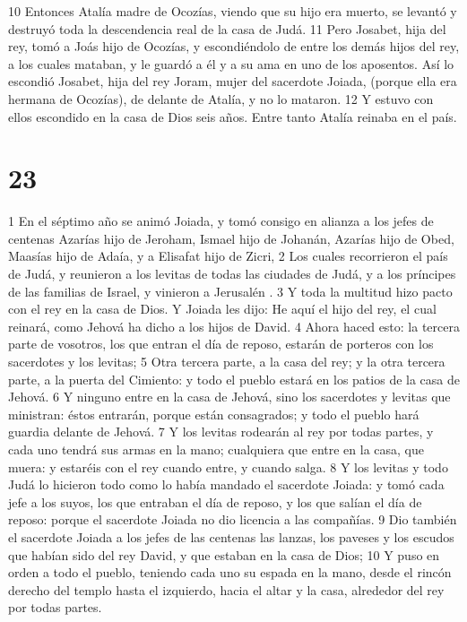 10 Entonces Atalía madre de Ocozías, viendo que su hijo era muerto, se levantó y destruyó toda la descendencia real de la casa de Judá.
11 Pero Josabet, hija del rey, tomó a Joás hijo de Ocozías, y escondiéndolo de entre los demás hijos del rey, a los cuales mataban, y le guardó a él y a su ama en uno de los aposentos. Así lo escondió Josabet, hija del rey Joram, mujer del sacerdote Joiada, (porque ella era hermana de Ocozías), de delante de Atalía, y no lo mataron.
12 Y estuvo con ellos escondido en la casa de Dios seis años. Entre tanto Atalía reinaba en el país.

\chapter{23}

1 En el séptimo año se animó Joiada, y tomó consigo en alianza a los jefes de centenas Azarías hijo de Jeroham, Ismael hijo de Johanán,  Azarías hijo de Obed, Maasías hijo de Adaía, y a Elisafat hijo de Zicri,
2 Los cuales recorrieron el país de Judá, y reunieron a los levitas de todas las ciudades de Judá, y a los príncipes de las familias de Israel, y vinieron a Jerusalén .
3 Y toda la multitud hizo pacto con el rey en la casa de Dios. Y Joiada les dijo: He aquí el hijo del rey, el cual reinará, como Jehová ha dicho a los hijos de David.
4 Ahora haced esto: la tercera parte de vosotros, los que entran el día de reposo, estarán de porteros con los sacerdotes y los levitas;
5 Otra tercera parte, a la casa del rey; y la otra tercera parte, a la puerta del Cimiento: y todo el pueblo estará en los patios de la casa de Jehová.
6 Y ninguno entre en la casa de Jehová, sino los sacerdotes y levitas que ministran: éstos entrarán, porque están consagrados; y todo el pueblo hará guardia delante de Jehová.
7 Y los levitas rodearán al rey por todas partes, y cada uno tendrá sus armas en la mano;  cualquiera que entre en la casa, que muera: y estaréis con el rey cuando entre, y cuando salga.
8 Y los levitas y todo Judá lo hicieron todo como lo había mandado el sacerdote Joiada: y tomó cada jefe a los suyos, los que entraban el día de reposo, y los que salían el día de reposo: porque el sacerdote Joiada no dio licencia a las compañías.
9 Dio también el sacerdote Joiada a los jefes de las centenas las lanzas, los paveses y los escudos que habían sido del rey David, y que estaban en la casa de Dios;
10 Y puso en orden a todo el pueblo, teniendo cada uno su espada en la mano, desde el rincón derecho del templo hasta el izquierdo, hacia el altar y la casa, alrededor del rey por todas partes.
